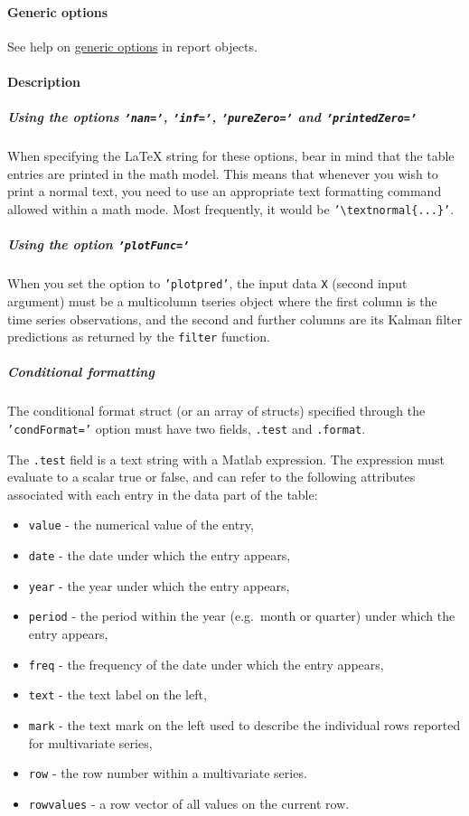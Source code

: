  \paragraph{Generic options}
 
 See help on \href{report/Contents}{generic options} in report objects.
 
 \paragraph{Description}
 
 \subparagraph{Using the options \texttt{'nan='}, \texttt{'inf='},
 \texttt{'pureZero='} and \texttt{'printedZero='}}
 
 When specifying the LaTeX string for these options, bear in mind that
 the table entries are printed in the math model. This means that
 whenever you wish to print a normal text, you need to use an appropriate
 text formatting command allowed within a math mode. Most frequently, it
 would be \texttt{'\textbackslash{}textnormal\{...\}'}.
 
 \subparagraph{Using the option \texttt{'plotFunc='}}
 
 When you set the option to \texttt{'plotpred'}, the input data
 \texttt{X} (second input argument) must be a multicolumn tseries object
 where the first column is the time series observations, and the second
 and further columns are its Kalman filter predictions as returned by the
 \texttt{filter} function.
 
 \subparagraph{Conditional formatting}
 
 The conditional format struct (or an array of structs) specified through
 the \texttt{'condFormat='} option must have two fields, \texttt{.test}
 and \texttt{.format}.
 
 The \texttt{.test} field is a text string with a Matlab expression. The
 expression must evaluate to a scalar true or false, and can refer to the
 following attributes associated with each entry in the data part of the
 table:
 
 \begin{itemize}
 \item
   \texttt{value} - the numerical value of the entry,
 \item
   \texttt{date} - the date under which the entry appears,
 \item
   \texttt{year} - the year under which the entry appears,
 \item
   \texttt{period} - the period within the year (e.g.~month or quarter)
   under which the entry appears,
 \item
   \texttt{freq} - the frequency of the date under which the entry
   appears,
 \item
   \texttt{text} - the text label on the left,
 \item
   \texttt{mark} - the text mark on the left used to describe the
   individual rows reported for multivariate series,
 \item
   \texttt{row} - the row number within a multivariate series.
 \item
   \texttt{rowvalues} - a row vector of all values on the current row.
 \end{itemize}
 
